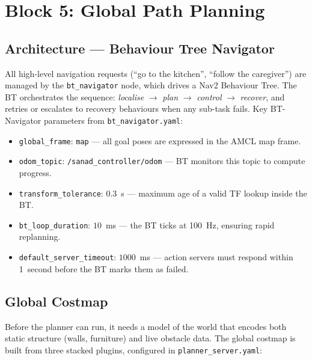 \section{Block 5: Global Path Planning}
\label{sec:planner}

\subsection*{Architecture --- Behaviour Tree Navigator}

All high-level navigation requests (``go to the kitchen'', ``follow the caregiver'') are managed by the \texttt{bt\_navigator} node, which drives a Nav2 Behaviour Tree. The BT orchestrates the sequence: \emph{localise} $\to$ \emph{plan} $\to$ \emph{control} $\to$ \emph{recover}, and retries or escalates to recovery behaviours when any sub-task fails. Key BT-Navigator parameters from \texttt{bt\_navigator.yaml}:
\begin{itemize}\itemsep=2pt
    \item \texttt{global\_frame}: \texttt{map} --- all goal poses are expressed in the AMCL map frame.
    \item \texttt{odom\_topic}: \texttt{/sanad\_controller/odom} --- BT monitors this topic to compute progress.
    \item \texttt{transform\_tolerance}: $0.3$~s --- maximum age of a valid TF lookup inside the BT.
    \item \texttt{bt\_loop\_duration}: $10$~ms --- the BT ticks at 100~Hz, ensuring rapid replanning.
    \item \texttt{default\_server\_timeout}: $1000$~ms --- action servers must respond within 1~second before the BT marks them as failed.
\end{itemize}

\subsection*{Global Costmap}

Before the planner can run, it needs a model of the world that encodes both static structure (walls, furniture) and live obstacle data. The global costmap is built from three stacked plugins, configured in \texttt{planner\_server.yaml}:

